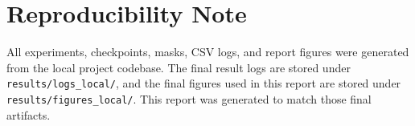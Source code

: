 \documentclass[11pt]{article}
\begin{document}
\section*{Reproducibility Note}
All experiments, checkpoints, masks, CSV logs, and report figures were generated from the local project codebase. The final result logs are stored under \texttt{results/logs\_local/}, and the final figures used in this report are stored under \texttt{results/figures\_local/}. This report was generated to match those final artifacts.



\end{document}
